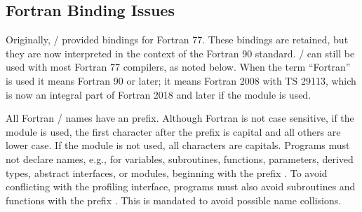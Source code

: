 %
%

\subsection{Fortran Binding Issues}
\label{sec:fortran-binding-issues}

Originally,
\MPIIDOTI/
provided bindings for Fortran 77.
These bindings are retained,
but they are now interpreted in the
context of the Fortran 90 standard. \MPI/ can still
be used with most Fortran 77 compilers, as noted below.
When the term ``Fortran'' is used it means
Fortran 90 or later;
it means Fortran 2008 with TS 29113,
which is now an integral part of Fortran 2018 and later if the
 module is used.

All Fortran \MPI/ names have an  prefix.
Although Fortran is not case sensitive, if the
 module is used, the first character after the
 prefix is capital and all others are lower case. If
the  module is not used, all characters are capitals.
Programs must not declare names, e.g., for
variables, subroutines,
functions, parameters, derived types, abstract interfaces, or modules,
beginning with the prefix .
To avoid
conflicting with the profiling interface, programs must also avoid subroutines and functions with the prefix .
This is mandated to avoid possible name collisions.

